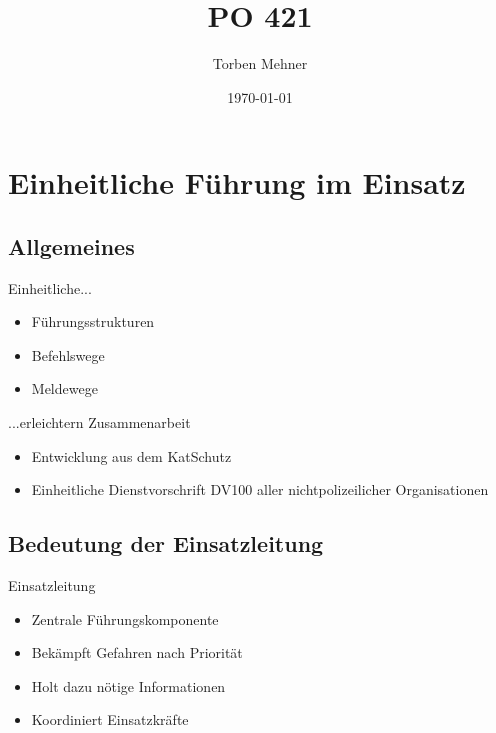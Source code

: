 \documentclass[notes]{beamer}
\title{PO 421}
\subtitle{}
\author{Torben Mehner}
\institute{Bezirk Karlsruhe}
\date{\today}
\begin{document}
	

\section{Einheitliche Führung im Einsatz}
\subsection{Allgemeines}

\begin{frame}{\subsecname}


Einheitliche...
\begin{itemize}
	\item Führungsstrukturen
	\item Befehlswege
	\item Meldewege
\end{itemize}
...erleichtern Zusammenarbeit

\end{frame}

\begin{frame}{\subsecname}

\begin{itemize}
	\item Entwicklung aus dem KatSchutz
	\item Einheitliche Dienstvorschrift DV100 aller nichtpolizeilicher Organisationen
\end{itemize}

\end{frame}

\subsection{Bedeutung der Einsatzleitung}
\begin{frame}{\subsecname}

Einsatzleitung
\begin{itemize}
	\item Zentrale Führungskomponente
	\item Bekämpft Gefahren nach Priorität
	\item Holt dazu nötige Informationen
	\item Koordiniert Einsatzkräfte
\end{itemize}

\end{frame}
\end{document}
